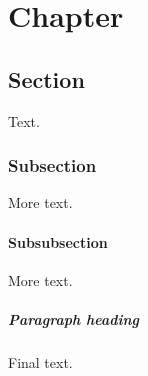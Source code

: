 \documentclass[11pt,a4paper]{report}
\begin{document}
\chapter{Chapter}
\section{Section}
Text.
\subsection{Subsection}
More text.
\subsubsection{Subsubsection}
More text.
\paragraph{Paragraph heading} Final text.
\end{document}
